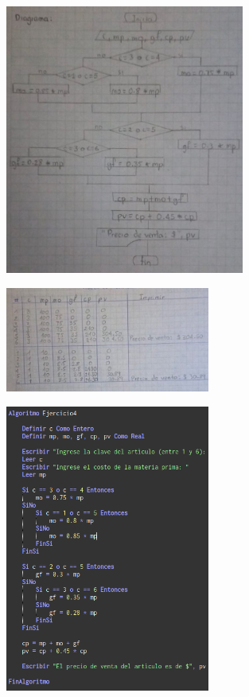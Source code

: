 \documentclass[12pt]{article}
\begin{document}
\begin{enumerate}
                \begin{figure}[!h]
                    \centering
                    \includegraphics[width=0.7\textwidth]{Img/DF_ej4_1.jpeg}
                \end{figure}

                \newpage
                \begin{figure}[!h]
                    \centering
                    \includegraphics[width=0.6\textwidth]{Img/DF_ej4_2.jpeg}
                \end{figure}

                \begin{figure}[!h]
                    \centering
                    \includegraphics[width=0.6\textwidth]{Img/Cod_ej4.png}
                \end{figure}


\end{enumerate}
\end{document}
